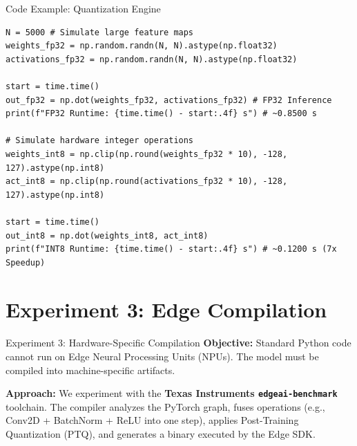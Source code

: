\documentclass[aspectratio=169]{beamer}
\begin{document}
\begin{frame}[fragile]{Code Example: Quantization Engine}
    \begin{lstlisting}
N = 5000 # Simulate large feature maps
weights_fp32 = np.random.randn(N, N).astype(np.float32)
activations_fp32 = np.random.randn(N, N).astype(np.float32)

start = time.time()
out_fp32 = np.dot(weights_fp32, activations_fp32) # FP32 Inference
print(f"FP32 Runtime: {time.time() - start:.4f} s") # ~0.8500 s

# Simulate hardware integer operations
weights_int8 = np.clip(np.round(weights_fp32 * 10), -128, 127).astype(np.int8)
act_int8 = np.clip(np.round(activations_fp32 * 10), -128, 127).astype(np.int8)

start = time.time()
out_int8 = np.dot(weights_int8, act_int8)
print(f"INT8 Runtime: {time.time() - start:.4f} s") # ~0.1200 s (7x Speedup)
    \end{lstlisting}
\end{frame}

\section{Experiment 3: Edge Compilation}

\begin{frame}{Experiment 3: Hardware-Specific Compilation}
    \textbf{Objective:} Standard Python code cannot run on Edge Neural Processing Units (NPUs). The model must be compiled into machine-specific artifacts.
    
    \vspace{0.3cm}
    \textbf{Approach:} We experiment with the \textbf{Texas Instruments \texttt{edgeai-benchmark}} toolchain. The compiler analyzes the PyTorch graph, fuses operations (e.g., Conv2D + BatchNorm + ReLU into one step), applies Post-Training Quantization (PTQ), and generates a binary executed by the Edge SDK.
\end{frame}
\end{document}
